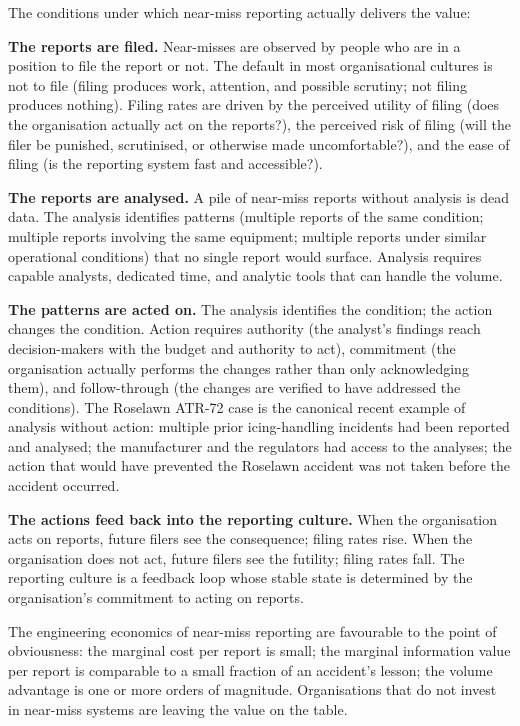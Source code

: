 The conditions under which near-miss reporting actually delivers the value:

\textbf{The reports are filed.} Near-misses are observed by people who are in a position to file the report or not. The default in most organisational cultures is not to file (filing produces work, attention, and possible scrutiny; not filing produces nothing). Filing rates are driven by the perceived utility of filing (does the organisation actually act on the reports?), the perceived risk of filing (will the filer be punished, scrutinised, or otherwise made uncomfortable?), and the ease of filing (is the reporting system fast and accessible?).

\textbf{The reports are analysed.} A pile of near-miss reports without analysis is dead data. The analysis identifies patterns (multiple reports of the same condition; multiple reports involving the same equipment; multiple reports under similar operational conditions) that no single report would surface. Analysis requires capable analysts, dedicated time, and analytic tools that can handle the volume.

\textbf{The patterns are acted on.} The analysis identifies the condition; the action changes the condition. Action requires authority (the analyst's findings reach decision-makers with the budget and authority to act), commitment (the organisation actually performs the changes rather than only acknowledging them), and follow-through (the changes are verified to have addressed the conditions). The Roselawn ATR-72 case \cite{acc:ntsb-aar96-01} is the canonical recent example of analysis without action: multiple prior icing-handling incidents had been reported and analysed; the manufacturer and the regulators had access to the analyses; the action that would have prevented the Roselawn accident was not taken before the accident occurred.

\textbf{The actions feed back into the reporting culture.} When the organisation acts on reports, future filers see the consequence; filing rates rise. When the organisation does not act, future filers see the futility; filing rates fall. The reporting culture is a feedback loop whose stable state is determined by the organisation's commitment to acting on reports.

The engineering economics of near-miss reporting are favourable to the point of obviousness: the marginal cost per report is small; the marginal information value per report is comparable to a small fraction of an accident's lesson; the volume advantage is one or more orders of magnitude. Organisations that do not invest in near-miss systems are leaving the value on the table.

